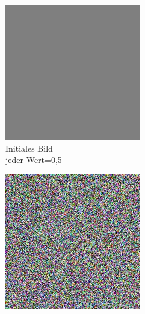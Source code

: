 \begin{figure}[!htb]
\centering
\begin{subfigure}[h]{0.3\textwidth}
  \centering
  \includegraphics[width=\linewidth]{figures/autoencoder_r18/faces_mi1.jpg}
  \caption{Initiales Bild\\jeder Wert=0,5}
\end{subfigure}
\begin{subfigure}[h]{0.3\textwidth}
  \centering
  \includegraphics[width=\linewidth]{figures/autoencoder_r18/faces_mi2.jpg}

\end{subfigure}
\end{figure}
